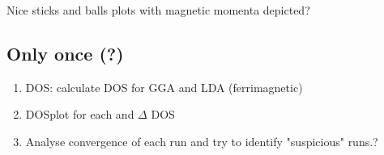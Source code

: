 \documentclass{article}
\begin{document}
	 


Nice sticks and balls plots with magnetic momenta depicted?

\subsection{Only once (?)}
\begin{enumerate}
    \item DOS:	calculate DOS for GGA and LDA (ferrimagnetic) 
	\item DOSplot for each and $\Delta$ DOS 
 \item Analyse convergence of each run and try to identify "suspicious" runs.?
 \ \end{enumerate}
\end{document}
